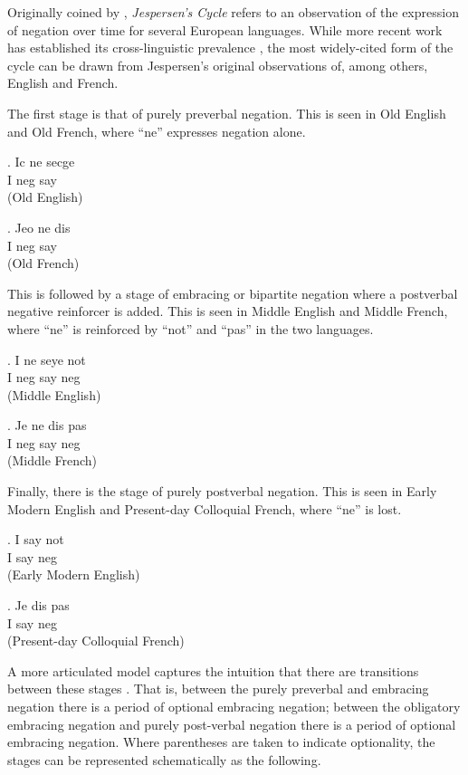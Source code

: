\documentclass[12pt]{article}
\theoremstyle{definition} \newtheorem{definition}{Definition}
\begin{document}
Originally coined by \cite{dahl:1979}, \emph{Jespersen's Cycle} refers to an observation of the expression of negation over time for several European languages. While more recent work has established its cross-linguistic prevalence \citep{vanGelderen2008negative}, the most widely-cited form of the  cycle can be drawn from Jespersen's original observations of, among others, English and French. 

The first stage is that of purely preverbal negation. This is seen in Old English and Old French, where ``ne'' expresses negation alone.

\exg. Ic ne secge\\
      I neg say\\
      (Old English)

\exg. Jeo ne dis\\
      I neg say\\
      (Old French)

This is followed by a stage of embracing or bipartite negation where a postverbal negative reinforcer is added. This is seen in Middle English and Middle French, where ``ne'' is reinforced by ``not'' and ``pas'' in the two languages.


\exg. I ne seye not\\
      I neg say neg\\
      (Middle English)

\exg. Je ne dis pas\\
      I neg say neg\\
      (Middle French)

Finally, there is the stage of purely postverbal negation. This is seen in Early Modern English and Present-day Colloquial French, where ``ne'' is lost.

\exg. I say not\\
      I say neg\\
      (Early Modern English)

\exg. Je dis pas\\
      I say neg\\
      (Present-day Colloquial French)


A more articulated model captures the intuition that there are transitions between these stages \citep{vanderAuwera2009}. That is, between the purely preverbal and embracing negation there is a period of optional embracing negation; between the obligatory embracing negation and purely post-verbal negation there is a period of optional embracing negation. Where parentheses are taken to indicate optionality, the stages can be represented schematically as the following.
\end{document}
